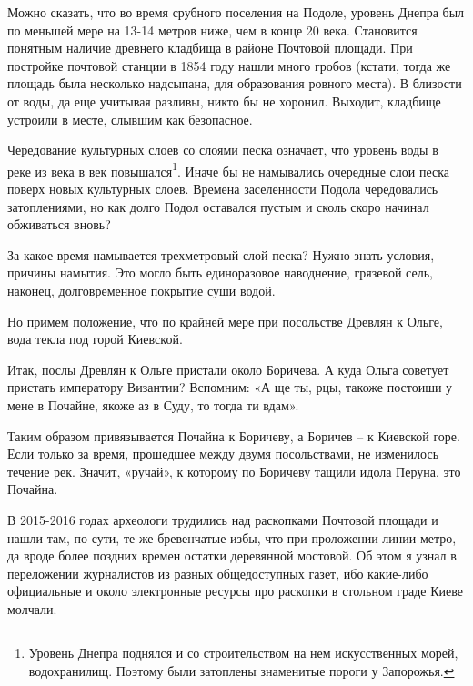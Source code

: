 Можно сказать, что во время срубного поселения на Подоле, уровень Днепра был по меньшей мере на 13-14 метров ниже, чем в конце 20 века. Становится понятным наличие древнего кладбища в районе Почтовой площади. При постройке почтовой станции в 1854 году нашли много гробов (кстати, тогда же площадь была несколько надсыпана, для образования ровного места). В близости от воды, да еще учитывая разливы, никто бы не хоронил. Выходит, кладбище устроили в месте, слывшим как безопасное.

Чередование культурных слоев со слоями песка означает, что уровень воды в реке из века в век повышался\footnote{Уровень Днепра поднялся и со строительством на нем искусственных морей, водохранилищ. Поэтому были затоплены знаменитые пороги у Запорожья.}. Иначе бы не намывались очередные слои песка поверх новых культурных слоев. Времена заселенности Подола чередовались затоплениями, но как долго Подол оставался пустым и сколь скоро начинал обживаться вновь?

За какое время намывается трехметровый слой песка? Нужно знать условия, причины намытия. Это могло быть единоразовое наводнение, грязевой сель, наконец, долговременное покрытие суши водой.

Но примем положение, что по крайней мере при посольстве Древлян к Ольге, вода текла под горой Киевской. 


Итак, послы Древлян к Ольге пристали около Боричева. А куда Ольга советует пристать императору Византии? Вспомним: «А ще ты, рцы, такоже постоиши у мене в Почайне, якоже аз в Суду, то тогда ти вдам».

Таким образом привязывается Почайна к Боричеву, а Боричев – к Киевской горе. Если только за время, прошедшее между двумя посольствами, не изменилось течение рек. Значит, «ручай», к которому по Боричеву тащили идола Перуна, это Почайна. 


В 2015-2016 годах археологи трудились над раскопками Почтовой площади и нашли там, по сути, те же бревенчатые избы, что при проложении линии метро, да вроде более поздних времен остатки деревянной мостовой. Об этом я узнал в переложении журналистов из разных общедоступных газет, ибо какие-либо официальные и около электронные ресурсы про раскопки в стольном граде Киеве молчали.

